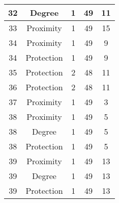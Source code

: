 \documentclass[results.tex]{subfiles}
\begin{document}
\begin{center}
\begin{tabular}{| c || c | c | c | c |}
            \hline
            32                      & Degree                       & 1                      & 49                      & 11                   \\
            \hline
            33                      & Proximity                    & 1                      & 49                      & 15                   \\
            \hline
            34                      & Proximity                    & 1                      & 49                      & 9                    \\
            \hline
            34                      & Protection                   & 1                      & 49                      & 9                    \\
            \hline
            35                      & Protection                   & 2                      & 48                      & 11                   \\
            \hline
            36                      & Protection                   & 2                      & 48                      & 11                   \\
            \hline
            37                      & Proximity                    & 1                      & 49                      & 3                    \\
            \hline
            38                      & Proximity                    & 1                      & 49                      & 5                    \\
            \hline
            38                      & Degree                       & 1                      & 49                      & 5                    \\
            \hline
            38                      & Protection                   & 1                      & 49                      & 5                    \\
            \hline
            39                      & Proximity                    & 1                      & 49                      & 13                   \\
            \hline
            39                      & Degree                       & 1                      & 49                      & 13                   \\
            \hline
            39                      & Protection                   & 1                      & 49                      & 13                   \\

\end{tabular}
\end{center}
\end{document}
